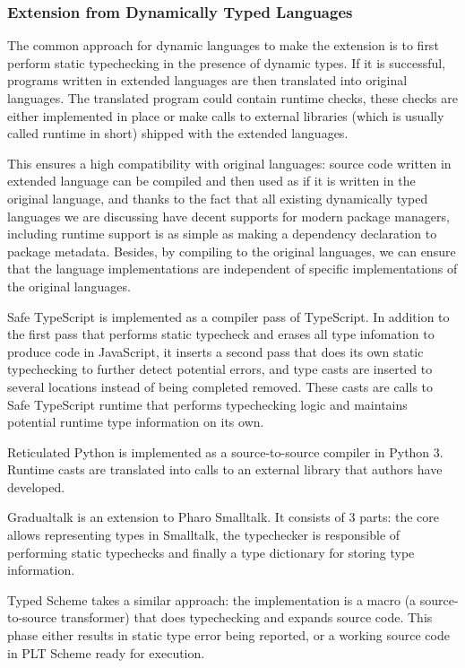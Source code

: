 \subsubsection{Extension from Dynamically Typed Languages}

The common approach for dynamic languages to make the extension
is to first perform static typechecking in the presence of dynamic types.
If it is successful, programs written in extended languages are then translated into original languages.
The translated program could contain runtime checks, these checks are either implemented in place or
make calls to external libraries (which is usually called runtime in short) shipped with
the extended languages.

This ensures a high compatibility with original languages: source code written in extended language
can be compiled and then used as if it is written in the original language, and thanks to the fact
that all existing dynamically typed languages
we are discussing have decent supports for modern package managers,
including runtime support is as simple as making a dependency declaration to package metadata.
Besides, by compiling to the original languages,
we can ensure that the language implementations
 are independent of specific implementations of the original languages.

Safe TypeScript is implemented as a compiler pass of TypeScript.
In addition to the first pass that performs static typecheck and erases all type infomation
to produce code in JavaScript, it inserts a second pass that
does its own static typechecking to further detect potential errors,
and type casts are inserted to several locations instead of being completed removed.
These casts are calls to Safe TypeScript runtime that performs typechecking logic and maintains
potential runtime type information on its own.

Reticulated Python is implemented as a source-to-source compiler
in Python 3. Runtime casts are translated into calls to an external library
that authors have developed.

Gradualtalk is an extension to Pharo Smalltalk. It consists of 3 parts:
the core allows representing types in Smalltalk, the typechecker
is responsible of performing static typechecks and finally
a type dictionary for storing type information.

Typed Scheme takes a similar approach: the implementation is a macro
(a source-to-source transformer) that does typechecking and expands source code.
This phase either results in static type error being reported,
or a working source code in PLT Scheme ready for execution.

